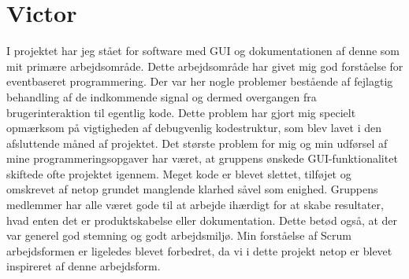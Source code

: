 \section{Victor}

I projektet har jeg stået for software med GUI og dokumentationen af denne som mit primære arbejdsområde. Dette arbejdsområde har givet mig god forståelse for eventbaseret programmering. Der var her nogle problemer bestående af fejlagtig behandling af de indkommende signal og dermed overgangen fra brugerinteraktion til egentlig kode. Dette problem har gjort mig specielt opmærksom på vigtigheden af debugvenlig kodestruktur, som blev lavet i den afsluttende måned af projektet. Det største problem for mig og min udførsel af mine programmeringsopgaver har været, at gruppens ønskede GUI-funktionalitet skiftede ofte projektet igennem. Meget kode er blevet slettet, tilføjet og omskrevet af netop grundet manglende klarhed såvel som enighed. Gruppens medlemmer har alle været gode til at arbejde ihærdigt for at skabe resultater, hvad enten det er produktskabelse eller dokumentation. Dette betød også, at der var generel god stemning og godt arbejdsmiljø. Min forståelse af Scrum arbejdsformen er ligeledes blevet forbedret, da vi i dette projekt netop er blevet inspireret af denne arbejdsform.